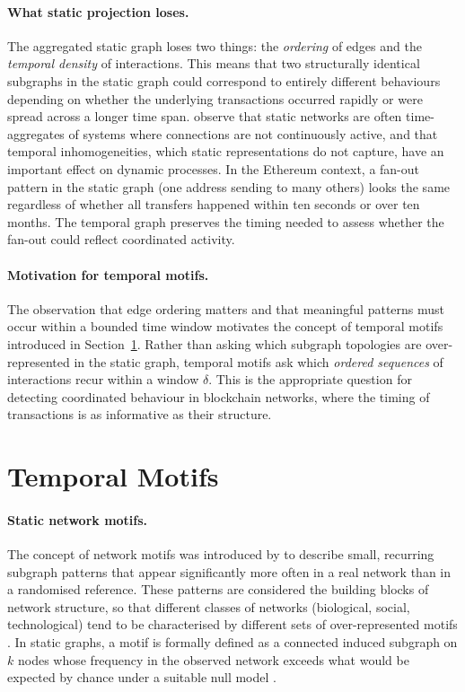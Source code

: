 \documentclass{thesisclass}
\begin{document}
\paragraph{What static projection loses.}
The aggregated static graph loses two things: the \emph{ordering} of edges and the \emph{temporal density} of interactions. This means that two structurally identical subgraphs in the static graph could correspond to entirely different behaviours depending on whether the underlying transactions occurred rapidly or were spread across a longer time span. \citet{kovanen2011temporal} observe that static networks are often time-aggregates of systems where connections are not continuously active, and that temporal inhomogeneities, which static representations do not capture, have an important effect on dynamic processes. In the Ethereum context, a fan-out pattern in the static graph (one address sending to many others) looks the same regardless of whether all transfers happened within ten seconds or over ten months. The temporal graph preserves the timing needed to assess whether the fan-out could reflect coordinated activity.

\paragraph{Motivation for temporal motifs.}
The observation that edge ordering matters and that meaningful patterns must occur within a bounded time window motivates the concept of temporal motifs introduced in Section~\ref{sec:motifs}. Rather than asking which subgraph topologies are over-represented in the static graph, temporal motifs ask which \emph{ordered sequences} of interactions recur within a window $\delta$. This is the appropriate question for detecting coordinated behaviour in blockchain networks, where the timing of transactions is as informative as their structure.

\section{Temporal Motifs}
\label{sec:motifs}

\paragraph{Static network motifs.}
The concept of network motifs was introduced by \citet{milo2002network} to describe small, recurring subgraph patterns that appear significantly more often in a real network than in a randomised reference. These patterns are considered the building blocks of network structure, so that different classes of networks (biological, social, technological) tend to be characterised by different sets of over-represented motifs \citep{milo2002network}. In static graphs, a motif is formally defined as a connected induced subgraph on $k$ nodes whose frequency in the observed network exceeds what would be expected by chance under a suitable null model \citep{milo2002network, newman2010networks}.
\end{document}
